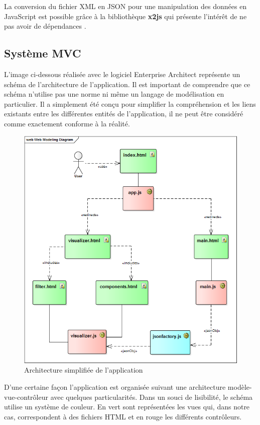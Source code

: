 \documentclass [a4paper,11pt]{article}
\begin{document}
La conversion du fichier XML en JSON pour une manipulation des données en JavaScript est possible grâce à la bibliothèque \textbf{x2js} qui présente l’intérêt de ne pas avoir de dépendances \cite{x2js14}.
\newline

\subsection{Système MVC}
L’image ci-dessous réalisée avec le logiciel Enterprise Architect représente un schéma de l’architecture de l’application. Il est important de comprendre que ce schéma n’utilise pas une norme ni même un langage de modélisation en particulier. Il a simplement été conçu pour simplifier la compréhension et les liens existants entre les différentes entités de l’application, il ne peut être considéré comme exactement conforme à la réalité.
\newline

\begin{figure}[!h]
\centering
\includegraphics[scale=0.5]{img/ped_architecture.png}
\caption[Résultats]{Architecture simplifiée de l'application}
\end{figure}

D’une certaine façon l’application est organisée suivant une architecture modèle-vue-contrôleur avec quelques particularités. Dans un souci de lisibilité, le schéma utilise un système de couleur. En vert sont représentées les vues qui, dans notre cas, correspondent à des fichiers HTML et en rouge les différents contrôleurs.\newline
\end{document}
